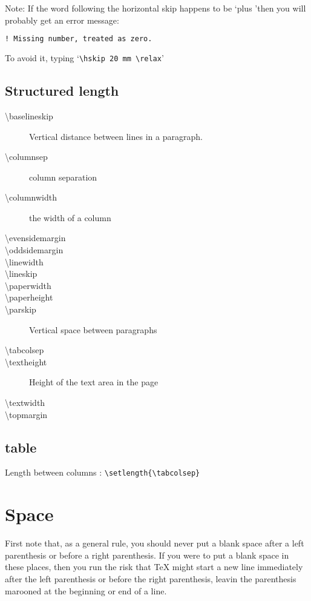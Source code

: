 Note: If the word following the horizontal skip happens to be \lq plus \rq then 
you will probably get an error message:
\begin{lstlisting}[language=TeX]
    ! Missing number, treated as zero.
\end{lstlisting}
To avoid it, typing `\verb|\hskip 20 mm \relax|'

\subsection{Structured length}
\begin{description}
    \item [\textbackslash{}baselineskip]    Vertical distance between lines in a paragraph.
    \item [\textbackslash{}columnsep]	    column separation
    \item [\textbackslash{}columnwidth]	    the width of a column
    \item [\textbackslash{}evensidemargin]  
    \item [\textbackslash{}oddsidemargin]    
    \item [\textbackslash{}linewidth]    
    \item [\textbackslash{}lineskip]    
    \item [\textbackslash{}paperwidth]    
    \item [\textbackslash{}paperheight]    
    \item [\textbackslash{}parskip]	    Vertical space between paragraphs
    \item [\textbackslash{}tabcolsep]    
    \item [\textbackslash{}textheight]	    Height of the text area in the page
    \item [\textbackslash{}textwidth]    
    \item [\textbackslash{}topmargin]    
\end{description}
\subsection{table}
Length between columns :
\verb|\setlength{\tabcolsep}|	

\section{Space}
First note that, as a general rule, you should never put a blank space after
a left parenthesis or before a right parenthesis. If you were to put a blank
space in these places, then you run the risk that \TeX{} might start a new line
immediately after the left parenthesis or before the right parenthesis, 
leavin the parenthesis marooned at the beginning or end of a line.


